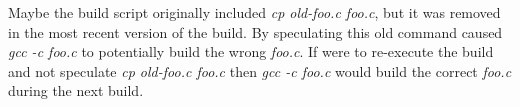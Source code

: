 Maybe the build script originally included \emph{cp old-foo.c foo.c}, but it was removed in the most recent version of the build.  By speculating this old command \Rattle caused \emph{gcc -c foo.c} to
potentially build the wrong \emph{foo.c}.  If \Rattle were to re-execute the build and not speculate \emph{cp old-foo.c foo.c} then \emph{gcc -c foo.c} would build the correct \emph{foo.c} during the next build.  %



